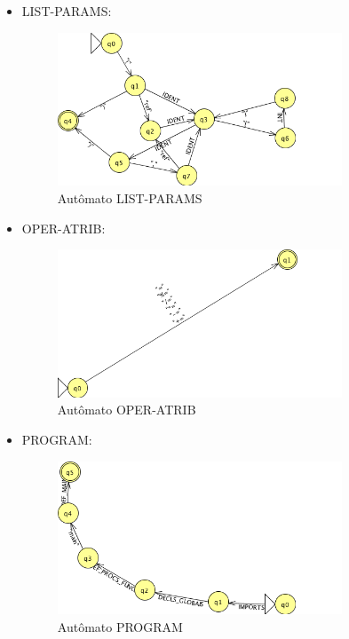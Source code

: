 \begin{itemize}
	\item LIST-PARAMS:
	\begin{figure}[H]
		\centering 
		\includegraphics[width=0.8\textwidth]{images/submaquinas/LIST-PARAMS.png}  
		\caption{Autômato LIST-PARAMS}
	\end{figure}
	
	\item OPER-ATRIB:
	\begin{figure}[H]
		\centering 
		\includegraphics[width=0.8\textwidth]{images/submaquinas/OPER-ATRIB.png}  
		\caption{Autômato OPER-ATRIB}
	\end{figure}
	
	\item PROGRAM:
	\begin{figure}[H]
		\centering 
		\includegraphics[width=0.8\textwidth]{images/submaquinas/PROGRAM.png}  
		\caption{Autômato PROGRAM}
	\end{figure}
	

\end{itemize}
